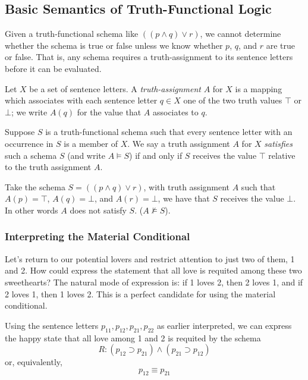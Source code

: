\subsection{Basic Semantics of Truth-Functional Logic}
Given a truth-functional schema like $((p \wedge q) \vee r)$, we cannot determine whether the schema is true or false unless we know whether $p$, $q$, and $r$ are true or false. That is, any schema requires a truth-assignment to its sentence letters before it can be evaluated. 

\begin{definition}
Let $X$ be a set of sentence letters. A \emph{truth-assignment} $A$ for $X$ is a mapping which associates with each sentence letter $q\in X$ one of the two truth values $\top$ or $\bot$; we write $A(q)$ for the value that $A$ associates to $q$. 
\end{definition}

\begin{definition}
Suppose $S$ is a truth-functional schema such that every sentence letter with an occurrence in $S$ is a member of $X$. We say a truth assignment $A$ for $X$ \emph{satisfies} such a schema $S$ (and write $A\models S$) if and only if $S$ receives the value $\top$ relative to the truth assignment $A$. 
\end{definition}

\begin{example}
Take the schema $S = ((p \wedge q) \vee r)$, with truth assignment $A$ such that $A(p) = \top$, $A(q) = \bot$, and $A(r) = \bot$, we have that $S$ receives the value $\bot$. In other words $A$ does not satisfy $S$. ($A \not \models S$).
\end{example}

\subsubsection*{Interpreting the Material Conditional}
Let's return to our potential lovers and restrict attention to just two of them, 1 and 2. How could express the statement that all love is requited among these two sweethearts? The natural mode of expression is: if 1 loves 2, then 2 loves 1, and if 2 loves 1, then 1 loves 2. This is a perfect candidate for using the material conditional.

Using the sentence letters $p_{11}, p_{12}, p_{21}, p_{22}$ as earlier interpreted, we can express the happy state that all love among 1 and 2 is requited by the schema
\[ 
    R: (p_{12}\supset p_{21}) \wedge (p_{21}\supset p_{12})
\]
or, equivalently, 
\[
    p_{12} \equiv p_{21}
\]

